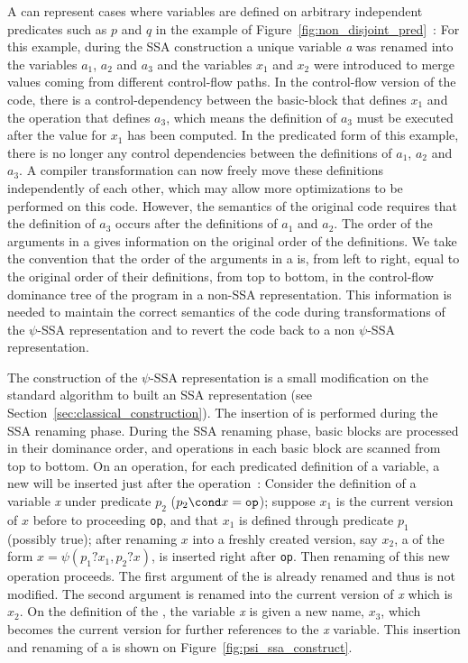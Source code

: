 A \psifun can represent cases where variables are defined on arbitrary independent
predicates such as $p$ and $q$ in the example of Figure~\ref{fig:non_disjoint_pred}~: For this example, during the SSA
construction a unique variable \textit{a} was renamed into the variables
${a_1}$, ${a_2}$ and ${a_3}$ and the variables ${x_1}$
and ${x_2}$ were introduced to merge values coming from different
control-flow paths. In the control-flow version of the code, there is a
control-dependency between the basic-block that defines ${x_1}$ and the operation that defines ${a_3}$, which means
the definition of ${a_3}$ must be executed after the value for
${x_1}$ has been computed. In the predicated form of this example,
there is no longer any control dependencies between the definitions of
${a_1}$, ${a_2}$ and ${a_3}$. A compiler transformation
can now freely move these definitions independently of each other,
which may allow more optimizations to be performed on this
code. However, the semantics of the original code requires that the
definition of ${a_3}$ occurs after the definitions of ${a_1}$
and ${a_2}$. The order of the arguments in a \psifun gives
information on the original order of the definitions. We take the
convention that the order of the arguments in a \psifun is,
from left to right, equal to the original order of their definitions,
from top to bottom, in the control-flow dominance tree of the program
in a non-SSA representation. This information is needed to maintain
the correct semantics of the code during transformations of the
$\psi$-SSA representation and to revert the code back to a non
$\psi$-SSA representation.


The construction of the $\psi$-SSA representation is a small
modification on the standard algorithm to built an SSA representation (see Section~\ref{sec:classical_construction}).
%
The insertion of \psifuns is performed during the SSA renaming
phase.
%
During the SSA renaming phase, basic blocks are processed in their
dominance order, and operations in each basic block are scanned from
top to bottom. On an operation, for each predicated definition of a
variable, a new \psifun will be inserted just after the
operation~: Consider the definition of a variable \textit{x} under predicate
${p_2}$ ($p_2\cond x= \texttt{op}$); suppose ${x_1}$ is the current version of $x$ before
to proceeding \texttt{op}, and that $x_1$ is defined through predicate $p_1$ (possibly true); after renaming $x$ into a freshly created version, say $x_2$, a \psifun of the form ${x = \psi(p_1?x_1,
  p_2?x)}$, is inserted right after \texttt{op}. 
Then renaming of this new operation proceeds. The first argument of
the \psifun is already renamed and thus is not modified. The
second argument is renamed into the current version of \textit{x}
which is ${x_2}$. On the definition of the \psifun, the
variable \textit{x} is given a new name, ${x_3}$, which becomes the
current version for further references to the \textit{x} variable. This
insertion and renaming of a \psifun is shown on
Figure~\ref{fig:psi_ssa_construct}.

